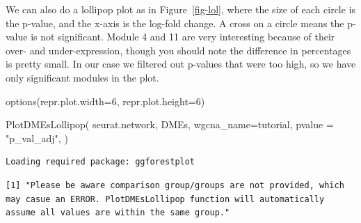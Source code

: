 \documentclass[
  letterpaper,
  DIV=11,
  numbers=noendperiod]{scrartcl}
\newenvironment{Shaded}{}{}
\newcommand{\AttributeTok}[1]{\textcolor[rgb]{0.49,0.56,0.16}{#1}}
\newcommand{\DecValTok}[1]{\textcolor[rgb]{0.25,0.63,0.44}{#1}}
\newcommand{\FunctionTok}[1]{\textcolor[rgb]{0.02,0.16,0.49}{#1}}
\newcommand{\NormalTok}[1]{#1}
\newcommand{\StringTok}[1]{\textcolor[rgb]{0.25,0.44,0.63}{#1}}
\begin{document}
We can also do a lollipop plot as in Figure~\ref{fig-lol}, where the
size of each circle is the p-value, and the x-axis is the log-fold
change. A cross on a circle means the p-value is not significant. Module
4 and 11 are very interesting because of their over- and
under-expression, though you should note the difference in percentages
is pretty small. In our case we filtered out p-values that were too
high, so we have only significant modules in the plot.

\begin{Shaded}
\begin{Highlighting}[]
\FunctionTok{options}\NormalTok{(}\AttributeTok{repr.plot.width=}\DecValTok{6}\NormalTok{, }\AttributeTok{repr.plot.height=}\DecValTok{6}\NormalTok{)}

\FunctionTok{PlotDMEsLollipop}\NormalTok{(}
\NormalTok{  seurat.network, }
\NormalTok{  DMEs, }
  \AttributeTok{wgcna\_name=}\StringTok{\textquotesingle{}tutorial\textquotesingle{}}\NormalTok{, }
  \AttributeTok{pvalue =} \StringTok{"p\_val\_adj"}\NormalTok{,}
\NormalTok{)}
\end{Highlighting}
\end{Shaded}

\begin{verbatim}
Loading required package: ggforestplot
\end{verbatim}

\begin{verbatim}
[1] "Please be aware comparison group/groups are not provided, which may casue an ERROR. PlotDMEsLollipop function will automatically assume all values are within the same group."
\end{verbatim}
\end{document}

